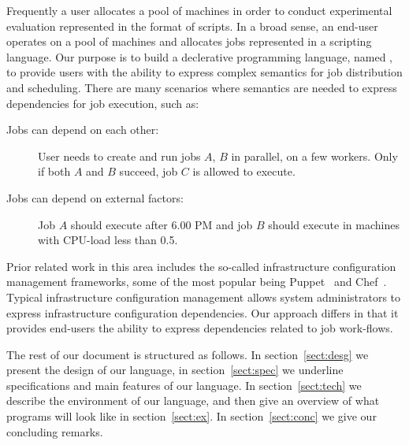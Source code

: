 
Frequently a user allocates a pool of machines in order to conduct experimental
evaluation represented in the format of scripts. In a broad sense, an end-user
operates on a pool of machines and allocates jobs represented in a scripting
language.
Our purpose is to build a declerative programming language, named \lang{},
to provide users with the ability to express complex semantics for job
distribution
and scheduling.
There are many scenarios where semantics are needed to express dependencies for
job execution, such as:
\begin{description}
\item[Jobs can depend on each other:] User needs to create and run jobs $A$,
$B$ in parallel, on a few workers. Only if both $A$ and $B$ succeed, job $C$
is allowed to execute.
\item[Jobs can depend on external factors:] Job $A$ should execute after 6.00 PM
and job $B$ should execute in machines with CPU-load less than 0.5.
\end{description}

Prior related work in this area includes the so-called infrastructure
configuration management frameworks, some of the most popular being
Puppet~\cite{puppet} and Chef~\cite{chef}. Typical infrastructure
configuration management allows system administrators to express
infrastructure configuration dependencies. Our approach differs in that
it provides end-users the ability to express dependencies related to
job work-flows.

The rest of our document is structured as follows. In section~\ref{sect:desg} we
present the design of our language, in section~\ref{sect:spec} we underline
specifications and main features of our language. In section~\ref{sect:tech} we
describe the environment of our language, and then give an overview of what
programs will look like in section~\ref{sect:ex}. In section~\ref{sect:conc} we
give our concluding remarks.


